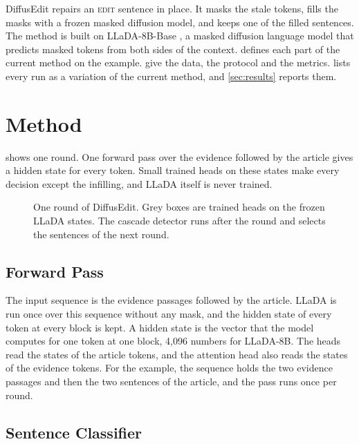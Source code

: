 \documentclass[]{paper}
\newcommand{\edit}{\textsc{edit}}
\begin{document}
DiffusEdit repairs an \edit{} sentence in place. It masks the stale tokens, fills the masks with a frozen masked diffusion model, and keeps one of the filled sentences. The method is built on LLaDA-8B-Base \citep{nie-etal-2025-llada}, a masked diffusion language model that predicts masked tokens from both sides of the context.  defines each part of the current method on the example.  give the data, the protocol and the metrics.  lists every run as a variation of the current method, and \cref{sec:results} reports them.

\section{Method}
\label{sec:method}

 shows one round. One forward pass over the evidence followed by the article gives a hidden state for every token. Small trained heads on these states make every decision except the infilling, and LLaDA itself is never trained.

\begin{figure}[t]
\centering

\caption{One round of DiffusEdit. Grey boxes are trained heads on the frozen LLaDA states. The cascade detector runs after the round and selects the sentences of the next round.}
\label{fig:pipeline}
\end{figure}

\subsection{Forward Pass}

The input sequence is the evidence passages followed by the article. LLaDA is run once over this sequence without any mask, and the hidden state of every token at every block is kept. A hidden state is the vector that the model computes for one token at one block, 4,096 numbers for LLaDA-8B\@. The heads read the states of the article tokens, and the attention head also reads the states of the evidence tokens. For the example, the sequence holds the two evidence passages and then the two sentences of the article, and the pass runs once per round.

\subsection{Sentence Classifier}
\end{document}
